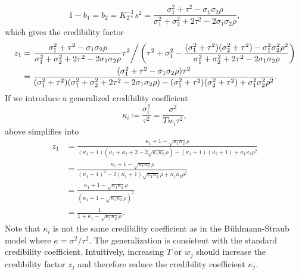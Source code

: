 \documentclass[11pt]{article}
\theoremstyle{definition}
\begin{document}
\begin{equation}\label{eq:2d_b}
    1-b_1 = b_2 =  K^{-1}_{2\ast}s^2 = \frac{\sigma_1^2 + \tau^2 - \sigma_1\sigma_2\rho}{\sigma_1^2+\sigma_2^2 + 2\tau^2 - 2\sigma_1\sigma_2\rho},
\end{equation}
which gives the credibility factor
\begin{equation*}
\begin{aligned}
        z_1 &= \left. \frac{\sigma_1^2 + \tau^2 - \sigma_1\sigma_2\rho}{\sigma_1^2+\sigma_2^2 + 2\tau^2 - 2\sigma_1\sigma_2\rho} \tau^2\right/ \left(\tau^2 + \sigma_1^2 - \frac{(\sigma_1^2 + \tau^2)(\sigma_2^2 + \tau^2)-\sigma_1^2\sigma_2^2\rho^2}{\sigma_1^2+\sigma_2^2 + 2\tau^2 - 2\sigma_1\sigma_2\rho}\right) \\
        &= \frac{(\sigma_1^2 + \tau^2 - \sigma_1\sigma_2\rho)\tau^2}{(\sigma_1^2+\tau^2)(\sigma_1^2+\sigma_2^2 + 2\tau^2 - 2\sigma_1\sigma_2\rho)-(\sigma_1^2 + \tau^2)(\sigma_2^2 + \tau^2)+\sigma_1^2\sigma_2^2\rho^2}.
\end{aligned}
\end{equation*}
If we introduce a generalized credibility coefficient
\begin{equation*}
    \kappa_i \coloneqq \frac{\sigma_i^2}{\tau^2} = \frac{\sigma^2}{Tw_i\tau^2},
\end{equation*}
above simplifies into
\begin{equation}\label{eq:2d_cred}
    \begin{aligned}
    z_1 &= \frac{\kappa_1 + 1 - \sqrt{\kappa_1\kappa_2}\rho}{(\kappa_1+1)(\kappa_1+\kappa_2+2-2\sqrt{\kappa_1\kappa_2}\rho)-(\kappa_1+1)(\kappa_2+1)+\kappa_1\kappa_2\rho^2} \\
    &= \frac{\kappa_1 + 1 - \sqrt{\kappa_1\kappa_2}\rho}{(\kappa_1+1)^2-2(\kappa_1+1)\sqrt{\kappa_1\kappa_2}\rho + \kappa_1\kappa_2\rho^2}\\
    &= \frac{\kappa_1 + 1 - \sqrt{\kappa_1\kappa_2}\rho}{(\kappa_1 + 1 - \sqrt{\kappa_1\kappa_2}\rho)^2} \\
    &= \frac{1}{1+\kappa_1-\sqrt{\kappa_1\kappa_2}\rho}.
    \end{aligned}
\end{equation}
Note that $\kappa_i$ is not the same credibility coefficient as in the Bühlmann-Straub model where $\kappa=\sigma^2/\tau^2$. The generalization is consistent with the standard credibility coefficient. Intuitively, increasing $T$ or $w_j$ should increase the credibility factor $z_j$ and therefore reduce the credibility coefficient $\kappa_j$.
\end{document}
